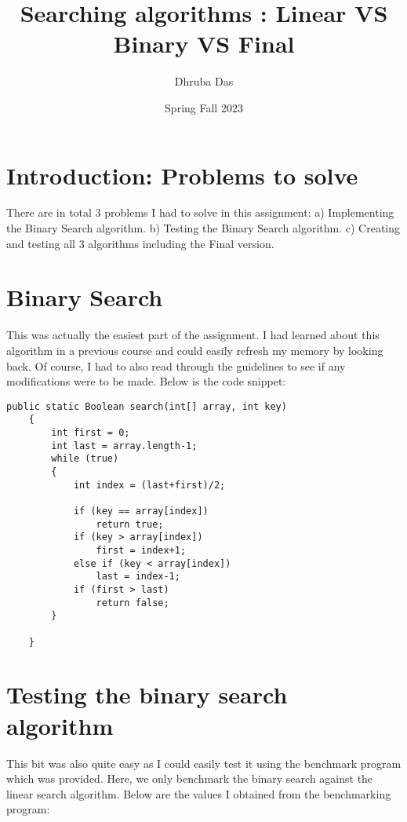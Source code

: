 \documentclass[a4paper,11pt]{article}
\begin{document}
\title{
    \textbf{Searching algorithms : Linear VS Binary VS Final}
}
\author{Dhruba Das}
\date{Spring Fall 2023}

\maketitle

\section*{Introduction: Problems to solve}

There are in total 3 problems I had to solve in this assignment: 
a) Implementing the Binary Search algorithm.
b) Testing the Binary Search algorithm.
c) Creating and testing all 3 algorithms including the Final version.

\section*{Binary Search}

This was actually the easiest part of the assignment. I had learned about this algorithm in a previous course and could easily refresh my memory by looking back. Of course, I had to also read through the guidelines to see if any modifications were to be made. Below is the code snippet:

\begin{verbatim}
public static Boolean search(int[] array, int key)
    {
        int first = 0;
        int last = array.length-1;
        while (true)
        {
            int index = (last+first)/2;

            if (key == array[index])
                return true;
            if (key > array[index])
                first = index+1;
            else if (key < array[index])
                last = index-1;
            if (first > last)
                return false;
        }
	
    }
\end{verbatim}

\section*{Testing the binary search algorithm}
This bit was also quite easy as I could easily test it using the benchmark program which was provided. Here, we only benchmark the binary search against the linear search algorithm. Below are the values I obtained from the benchmarking program:
\end{document}
